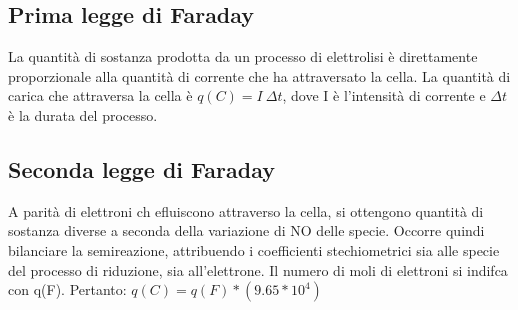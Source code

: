 \subsection{Prima legge di Faraday}
La quantità di sostanza prodotta da un processo di elettrolisi è direttamente proporzionale alla quantità di corrente che ha attraversato la cella. La quantità di carica che attraversa la cella è $q(C) = I\ \Delta t$, dove I è l'intensità di corrente e $\Delta t$ è la durata del processo.
\subsection{Seconda legge di Faraday}
A parità di elettroni ch efluiscono attraverso la cella, si ottengono quantità di sostanza diverse a seconda della variazione di NO delle specie. Occorre quindi bilanciare la semireazione, attribuendo i coefficienti stechiometrici sia alle specie del processo di riduzione, sia all'elettrone. Il numero di moli di elettroni si indifca con q(F). Pertanto: $q(C) =q(F)*(9.65 * 10^4)$